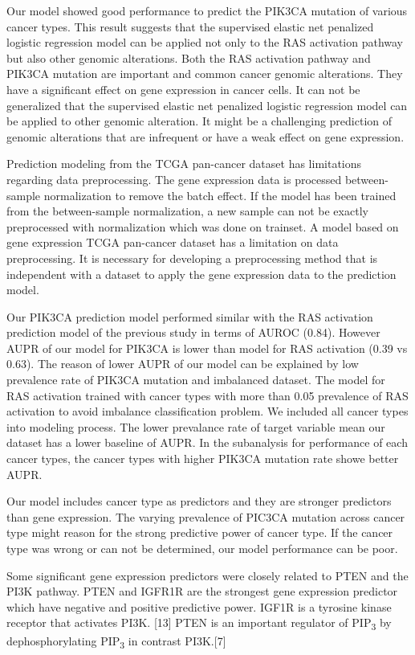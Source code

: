 \documentclass[10pt,letterpaper]{article}
\begin{document}
Our model showed good performance to predict the PIK3CA mutation of
various cancer types. This result suggests that the supervised elastic
net penalized logistic regression model can be applied not only to the
RAS activation pathway but also other genomic alterations. Both the RAS
activation pathway and PIK3CA mutation are important and common cancer
genomic alterations. They have a significant effect on gene expression
in cancer cells. It can not be generalized that the supervised elastic
net penalized logistic regression model can be applied to other genomic
alteration. It might be a challenging prediction of genomic alterations
that are infrequent or have a weak effect on gene expression.

Prediction modeling from the TCGA pan-cancer dataset has limitations
regarding data preprocessing. The gene expression data is processed
between-sample normalization to remove the batch effect. If the model
has been trained from the between-sample normalization, a new sample can
not be exactly preprocessed with normalization which was done on
trainset. A model based on gene expression TCGA pan-cancer dataset has a
limitation on data preprocessing. It is necessary for developing a
preprocessing method that is independent with a dataset to apply the
gene expression data to the prediction model.

Our PIK3CA prediction model performed similar with the RAS activation
prediction model of the previous study in terms of AUROC (0.84). However
AUPR of our model for PIK3CA is lower than model for RAS activation
(0.39 vs 0.63). The reason of lower AUPR of our model can be explained
by low prevalence rate of PIK3CA mutation and imbalanced dataset. The
model for RAS activation trained with cancer types with more than 0.05
prevalence of RAS activation to avoid imbalance classification problem.
We included all cancer types into modeling process. The lower prevalance
rate of target variable mean our dataset has a lower baseline of AUPR.
In the subanalysis for performance of each cancer types, the cancer
types with higher PIK3CA mutation rate showe better AUPR.

Our model includes cancer type as predictors and they are stronger
predictors than gene expression. The varying prevalence of PIC3CA
mutation across cancer type might reason for the strong predictive power
of cancer type. If the cancer type was wrong or can not be determined,
our model performance can be poor.

Some significant gene expression predictors were closely related to PTEN
and the PI3K pathway. PTEN and IGFR1R are the strongest gene expression
predictor which have negative and positive predictive power. IGF1R is a
tyrosine kinase receptor that activates PI3K. {[}13{]} PTEN is an
important regulator of PIP\textsubscript{3} by dephosphorylating
PIP\textsubscript{3} in contrast PI3K.{[}7{]}
\end{document}
